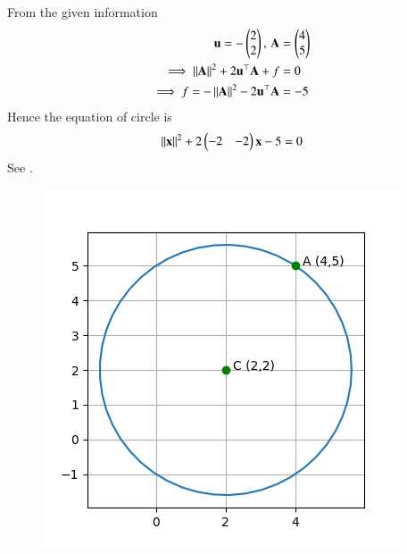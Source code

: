 From the given information
\begin{align}
	\mathbf{u} = -\begin{pmatrix}2\\2\end{pmatrix}, \, \mathbf{A} &= \begin{pmatrix}4\\5\end{pmatrix}\\
\implies	\left\lVert\mathbf{A}\right\rVert^2+2\mathbf{u}^\top\mathbf{A}+f &= 0\\
\implies	f = -\left\lVert\mathbf{A}\right\rVert^2 - 2\mathbf{u}^\top\mathbf{A}
	&= -5
\end{align}
Hence the equation of circle is 
\begin{align}
	\left\lVert\mathbf{x}\right\rVert^2+2\begin{pmatrix}-2&-2\end{pmatrix}\mathbf{x}-5 = 0 	
\end{align}
See 
.
\begin{figure}[ht]
\centering
\includegraphics[width = \columnwidth]{chapters/11/11/1/14/figs/fig.png}
\caption{}
\label{fig:chapters/11/11/1/14/1}
\end{figure}






